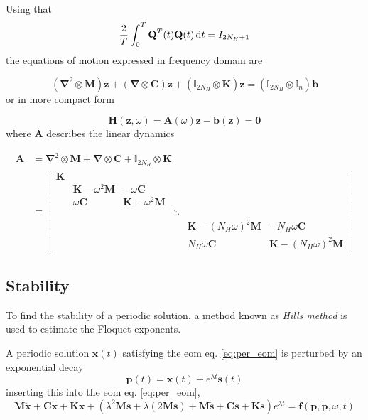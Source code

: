 Using that
\begin{equation}
  \frac{2}{T}\int^T_0 \bm Q^T(t) \bm Q(t) \d t = I_{2N_H+1}
\end{equation}
the equations of motion expressed in frequency domain are

\begin{equation}
  (\bm \nabla^2 \otimes \bm M)\bm z + (\bm \nabla \otimes \bm C)\bm z +
  (\mathbb{I}_{2N_H} \otimes \bm K)\bm z =
  (\mathbb{I}_{2N_H} \otimes \mathbb{I}_n )\bm b
\end{equation}
or in more compact form

\begin{equation}
  \bm H(\bm z, \omega) = \bm A(\omega) \bm z - \bm b(\bm z) = \bm 0
\end{equation}
where $\bm A$ describes the linear dynamics

\begin{equation}
  \label{eq:hb_A}
  \begin{aligned}
    \bm A &= \bm \nabla^2 \otimes \bm M + \bm \nabla \otimes \bm C +
    \mathbb{I}_{2N_H} \otimes \bm K \\
    &=
    \begin{bmatrix}
      \bm K \\
      & \bm K - \omega^2 \bm M & -\omega \bm C \\
      & \omega \bm C & \bm K - \omega^2 \bm M \\
      & & & \ddots \\
      & & & & \bm K - (N_H \omega)^2 \bm M & -N_H \omega \bm C \\
      & & & & N_H \omega \bm C & \bm K - (N_H \omega)^2 \bm M
    \end{bmatrix}
  \end{aligned}
\end{equation}


\subsection{Stability}
\label{sec:hb_stab_appendix}

To find the stability of a periodic solution, a method known as \textit{Hills
  method} is used to estimate the Floquet exponents.

A periodic solution $\bm x(t)$ satisfying the eom eq. \eqref{eq:per_eom} is
perturbed by an exponential decay
\begin{equation}
  \label{eq:hb_pert}
  \bm p(t) = \bm x(t) + e^{\lambda t}\bm s(t)
\end{equation}
inserting this into the eom eq. \eqref{eq:per_eom},
\begin{equation}
  \bm M\ddot{\bm x} + \bm C\dot{\bm x} + \bm K\bm x +
  (\lambda^2 \bm M \bm s + \lambda(2\bm M \dot{\bm s}) +
  \bm M\ddot{\bm s} + \bm C\dot{\bm s} + \bm K \bm s ) e^{\lambda t} =
  \bm f(\bm p, \dot{\bm p}, \omega, t)
\end{equation}

